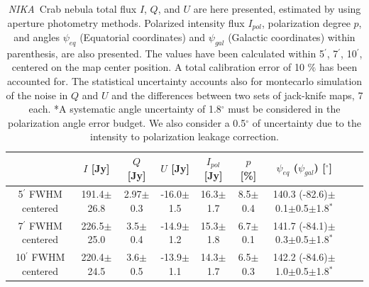 \documentclass[twocolumn,traditabstract]{aa}
\def\NIKA{\textit{NIKA}}
\begin{document}
\begin{table}[h!]
  \centering
      \begin{tabular}{ccccccccc}
      \hline
      \hline
       & \small $I$ [Jy] & \small $Q$ [Jy] & \small $U$ [Jy] & \small $I_{pol}$ [Jy] & \small $p$ [\%] & \small $\psi_{eq}$ ($\psi_{gal}$) [$^\circ$] \\
      \hline

\small 5$^{\prime}$ FWHM centered & \small 191.4$\pm$26.8 & \small 2.97$\pm$0.3 & \small -16.0$\pm$1.5 & \small 16.3$\pm$1.7 & \small 8.5$\pm$0.4 & \small 140.3 (-82.6)$\pm$0.1$\pm$0.5$\pm$1.8$^*$  \\ 
\small 7$^{\prime}$ FWHM centered & \small 226.5$\pm$25.0 & \small 3.5$\pm$0.4 & \small -14.9$\pm$1.2 & \small 15.3$\pm$1.8 & \small 6.7$\pm$0.1 & \small 141.7 (-84.1)$\pm$0.3$\pm$0.5$\pm$1.8$^*$ \\ 
\small 10$^{\prime}$ FWHM centered & \small 220.4$\pm$24.5 & \small 3.6$\pm$0.5 & \small -13.9$\pm$1.1 & \small 14.3$\pm$1.7 & \small 6.5$\pm$0.3 & \small 142.2 (-84.6)$\pm$1.0$\pm$0.5$\pm$1.8$^*$ \\ 
\hline            
    \hline   
    \end{tabular}
   \caption{ 
   \NIKA\ Crab nebula total flux $I$, $Q$, and $U$ are here presented, estimated by using aperture photometry methods. Polarized intensity flux $I_{pol}$, polarization degree $p$, and angles $\psi_{eq}$ (Equatorial coordinates) and $\psi_{gal}$ (Galactic coordinates) within parenthesis, are also presented. The values have been calculated within 5$^{\prime}$, 7$^{\prime}$, 10$^{\prime}$, centered on the map center position.
   A total calibration error of 10 $\%$ has been accounted for. The statistical uncertainty accounts also for montecarlo simulation of the noise in $Q$ and $U$ and the differences between two sets of jack-knife maps, 7 each.
 *A systematic angle uncertainty of 1.8$^{\circ}$ must be considered in the polarization angle error budget. We also consider a 0.5$^{\circ}$ of uncertainty due to the intensity to polarization leakage correction.    
    }
    \label{tab:crab_results}
 \end{table}
\end{document}
